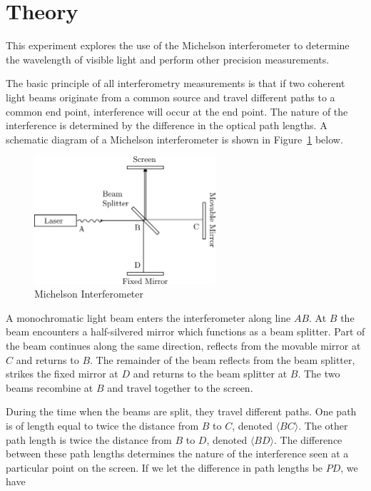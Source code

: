 \section{Theory}

This experiment explores the use of the Michelson interferometer to
determine the wavelength of visible light and perform other precision
measurements.

The basic principle of all interferometry measurements is that 
if two coherent light beams originate from a common source and 
travel different paths to a common end point, interference will 
occur at the end point. The nature of the interference is determined 
by the difference in the optical path lengths. A schematic diagram 
of a Michelson interferometer is shown in Figure~\ref{schematic} below.

\begin{figure}[htbp]
\begin{center}
\includegraphics[width=0.6\textwidth]{../images/inter.png}
\caption{Michelson Interferometer }
\label{schematic}
\end{center}
\end{figure}

A monochromatic light beam enters the interferometer along line $AB$. At
$B$ the beam encounters a half-silvered mirror which functions as a beam
splitter. Part of the beam continues along the same direction, reflects
from the movable mirror at $C$ and returns to $B$. The remainder of the beam
reflects from the beam splitter, strikes the fixed mirror at $D$ and
returns to the beam splitter at $B$. The two beams recombine at $B$ and
travel together to the screen. 

During the time when the beams are split, they travel different 
paths. One path is of length equal to twice the distance from 
$B$ to $C$, denoted $\langle BC\rangle$. The other path length is twice 
the distance from $B$ to $D$, denoted $\langle BD\rangle$. The difference 
between these path lengths determines the nature of the interference 
seen at a particular point on the screen. If we let the difference in path lengths be $PD$, we have

